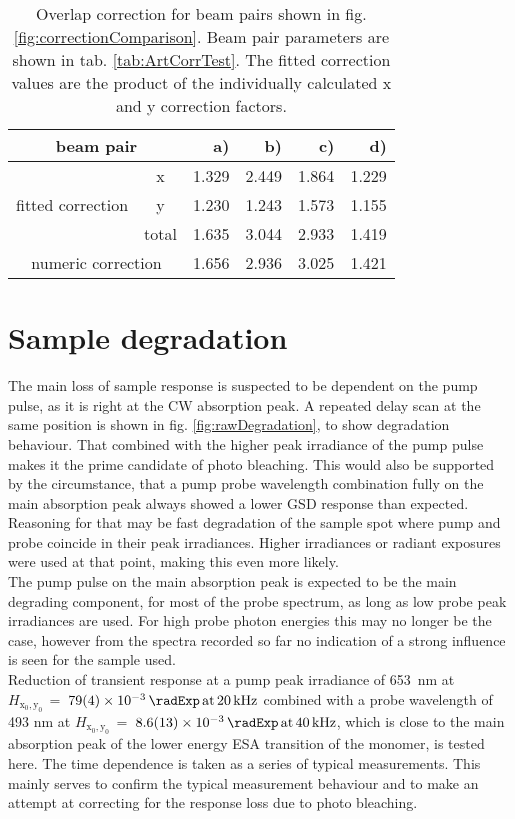 \documentclass[twoside,openright,listof=numbered]{scrreprt}
\def\pumpExp#1{\ensuremath{\SI{#1}{\radExp}\,\mathrm{at}\, \SI{20}{\kilo\hertz}}}
\def\probeExp#1{\ensuremath{\SI{#1}{\radExp}\,\mathrm{at}\, \SI{40}{\kilo\hertz}}}
\def\radiantExp{\ensuremath{H_\mathrm{x_0,y_0}}}
\begin{document}
\begin{table}[H]
\caption[Overlap correction for beam pairs shown in fig. \ref{fig:correctionComparison}.]{Overlap correction for beam pairs shown in fig. \ref{fig:correctionComparison}. Beam pair parameters are shown in tab. \ref{tab:ArtCorrTest}. The fitted correction values are the product of the individually calculated x and y correction factors.\label{tab:numVsfittedCorrection}}
\centering
\begin{tabular}{ccrrrr}
\toprule
\multicolumn{2}{c}{beam pair} & a) & b) & c) & d) \\ 
\midrule
\multirow{3}{*}{fitted correction} & x & 1.329& 2.449& 1.864& 1.229\\
& y & 1.230& 1.243& 1.573& 1.155\\
& total & 1.635 & 3.044 & 2.933 & 1.419 \\ \midrule
\multicolumn{2}{c}{numeric correction} & 1.656 & 2.936 & 3.025 & 1.421 \\ 
\bottomrule
\end{tabular} 
\end{table}




\FloatBarrier
\section{Sample degradation}\label{sec:degradation}
The main loss of sample response is suspected to be dependent on the pump pulse, as it is right at the CW absorption peak. A repeated delay scan at the same position is shown in fig. \ref{fig:rawDegradation}, to show degradation behaviour. That combined with the higher peak irradiance of the pump pulse makes it the prime candidate of photo bleaching. This would also be supported by the circumstance, that a pump probe wavelength combination fully on the main absorption peak always showed a lower GSD response than expected. Reasoning for that may be fast degradation of the sample spot where pump and probe coincide in their peak irradiances. Higher irradiances or radiant exposures were used at that point, making this even more likely.\\
The pump pulse on the main absorption peak is expected to be the main degrading component, for most of the probe spectrum, as long as low probe peak irradiances are used. For high probe photon energies this may no longer be the case, however from the spectra recorded so far no indication of a strong influence is seen for the sample used.\\
Reduction of transient response at a pump peak irradiance of \qty{653}{\nano\meter} at $\radiantExp\,=\;$\pumpExp{79(4)e-3} combined with a probe wavelength of 493 nm at $\radiantExp\,=\;$\probeExp{8.6(1.3)e-3}, which is close to the main absorption peak of the lower energy ESA transition of the monomer, is tested here. The time dependence is taken as a series of typical measurements. This mainly serves to confirm the typical measurement behaviour and to make an attempt at correcting for the response loss due to photo bleaching.
\end{document}
